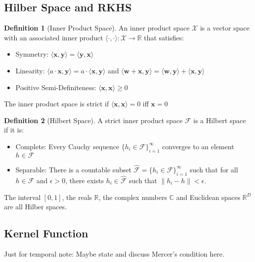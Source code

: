 \documentclass[12pt]{article}
\theoremstyle{definition}
\newtheorem{definition}{Definition}[section]
\theoremstyle{remark}
\begin{document}
\subsection{Hilber Space and RKHS}
\begin{definition}[Inner Product Space]
  An inner product space \(\mathcal{X}\) is a vector space with an associated inner product \(\langle \cdot,\cdot \rangle: \mathcal{X} \rightarrow \mathbb{R}\) that satisfies:
  \begin{itemize}
    \item Symmetry: \(\langle \mathbf{x}, \mathbf{y} \rangle = \langle \mathbf{y}, \mathbf{x} \rangle\)
    \item Linearity: \(\langle a \cdot \mathbf{x}, \mathbf{y} \rangle = a \cdot \langle \mathbf{x}, \mathbf{y} \rangle\) and \(\langle \mathbf{w} + \mathbf{x}, \mathbf{y} \rangle =  \langle \mathbf{w}, \mathbf{y} \rangle + \langle \mathbf{x}, \mathbf{y} \rangle\)
    \item Positive Semi-Definiteness: \( \langle \mathbf{x}, \mathbf{x} \rangle \geq 0 \)
  \end{itemize}
  The inner product space is strict if \( \langle \mathbf{x}, \mathbf{x} \rangle = 0 \) iff \( \mathbf{x} = 0 \)
\end{definition}

\begin{definition}[Hilbert Space]
  A strict inner product space \(\mathcal{F}\) is a Hilbert space if it is:
  \begin{itemize}
    \item Complete: Every Cauchy sequence \(\{ h_i \in \mathcal{F} \}_{i=1}^\infty\) converges to an element \(h \in \mathcal{F}\)
    \item Separable: There is a countable subset \( \mathcal{\hat{F}} = \{ h_i \in \mathcal{F} \}_{i=1}^\infty \) such that for all \(h \in \mathcal{F}\) and \(\epsilon > 0 \), there exists \(h_i \in \mathcal{\hat{F}}\) such that \(\| h_i - h\| < \epsilon\).
  \end{itemize}
\end{definition}

The interval \([0, 1]\), the reals \(\mathbb{R}\), the complex numbers \(\mathbb{C}\) and Euclidean spaces \(\mathbb{R}^D\) are all Hilber spaces.
\subsection{Kernel Function}
Just for temporal note: Maybe state and discuss Mercer's condition here.
\end{document}
